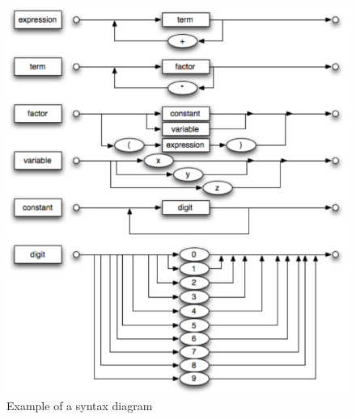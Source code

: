 \begin{figure}[h] 
	\centering
	\includegraphics[scale=.68]{images/syntaxDiagram.png}
	\caption{Example of a syntax diagram}
	\label{fig:syntaxDiagram}
\end{figure}
